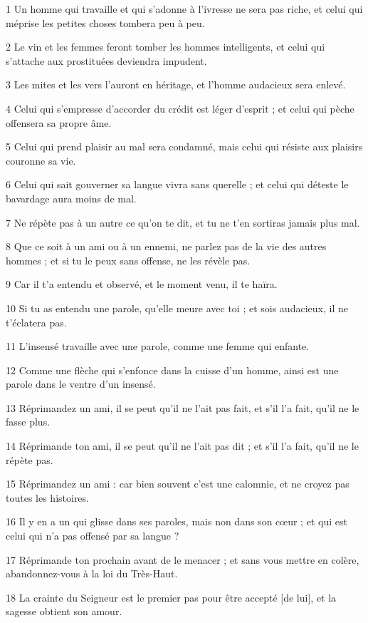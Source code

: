 \par 1 Un homme qui travaille et qui s'adonne à l'ivresse ne sera pas riche, et celui qui méprise les petites choses tombera peu à peu.
\par 2 Le vin et les femmes feront tomber les hommes intelligents, et celui qui s'attache aux prostituées deviendra impudent.
\par 3 Les mites et les vers l'auront en héritage, et l'homme audacieux sera enlevé.
\par 4 Celui qui s'empresse d'accorder du crédit est léger d'esprit ; et celui qui pèche offensera sa propre âme.
\par 5 Celui qui prend plaisir au mal sera condamné, mais celui qui résiste aux plaisirs couronne sa vie.
\par 6 Celui qui sait gouverner sa langue vivra sans querelle ; et celui qui déteste le bavardage aura moins de mal.
\par 7 Ne répète pas à un autre ce qu'on te dit, et tu ne t'en sortiras jamais plus mal.
\par 8 Que ce soit à un ami ou à un ennemi, ne parlez pas de la vie des autres hommes ; et si tu le peux sans offense, ne les révèle pas.
\par 9 Car il t'a entendu et observé, et le moment venu, il te haïra.
\par 10 Si tu as entendu une parole, qu'elle meure avec toi ; et sois audacieux, il ne t'éclatera pas.
\par 11 L'insensé travaille avec une parole, comme une femme qui enfante.
\par 12 Comme une flèche qui s'enfonce dans la cuisse d'un homme, ainsi est une parole dans le ventre d'un insensé.
\par 13 Réprimandez un ami, il se peut qu'il ne l'ait pas fait, et s'il l'a fait, qu'il ne le fasse plus.
\par 14 Réprimande ton ami, il se peut qu'il ne l'ait pas dit ; et s'il l'a fait, qu'il ne le répète pas.
\par 15 Réprimandez un ami : car bien souvent c'est une calomnie, et ne croyez pas toutes les histoires.
\par 16 Il y en a un qui glisse dans ses paroles, mais non dans son cœur ; et qui est celui qui n'a pas offensé par sa langue ?
\par 17 Réprimande ton prochain avant de le menacer ; et sans vous mettre en colère, abandonnez-vous à la loi du Très-Haut.
\par 18 La crainte du Seigneur est le premier pas pour être accepté [de lui], et la sagesse obtient son amour.
